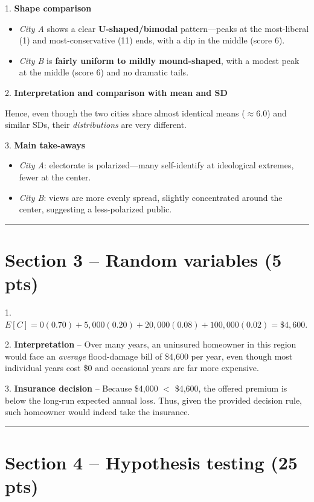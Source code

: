 \documentclass{article}
\begin{document}
1. \textbf{Shape comparison}
   \begin{itemize}
     \item \textit{City A} shows a clear \textbf{U-shaped/bimodal} pattern—peaks at the most-liberal (1) and most-conservative (11) ends, with a dip in the middle (score 6).
     \item \textit{City B} is \textbf{fairly uniform to mildly mound-shaped}, with a modest peak at the middle (score 6) and no dramatic tails.
   \end{itemize}

2. \textbf{Interpretation and comparison with mean and SD}

   Hence, even though the two cities share almost identical means ($\approx 6.0$) and similar SDs, their \textit{distributions} are very different.

3. \textbf{Main take-aways}
   \begin{itemize}
     \item \textit{City A}: electorate is polarized—many self-identify at ideological extremes, fewer at the center.
     \item \textit{City B}: views are more evenly spread, slightly concentrated around the center, suggesting a less-polarized public.
   \end{itemize}

\vspace{1em} %
\hrule %

\section*{Section 3 – Random variables (5 pts)}

1. $E[C]=0(0.70)+5{,}000(0.20)+20{,}000(0.08)+100{,}000(0.02)=\$4{,}600$.

2. \textbf{Interpretation} – Over many years, an uninsured homeowner in this region would face an \textit{average} flood-damage bill of \$4,600 per year, even though most individual years cost \$0 and occasional years are far more expensive.

3. \textbf{Insurance decision} – Because \$4,000 $<$ \$4,600, the offered premium is below the long-run expected annual loss. Thus, given the provided decision rule, such homeowner would indeed take the insurance. 

\vspace{1em} %
\hrule %

\section*{Section 4 – Hypothesis testing (25 pts)}
\end{document}

